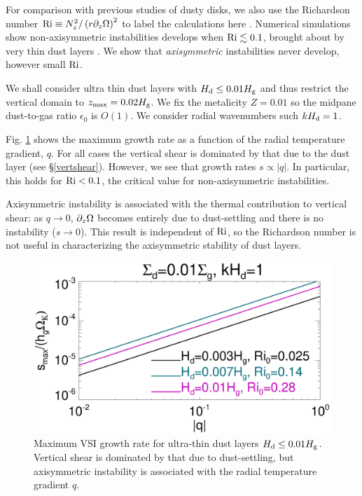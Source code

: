 For comparison with previous studies of dusty disks, we also use 
the Richardson number $\mathrm{Ri} \equiv N_z^2/\left(r\partial_z\Omega\right)^2$
to label the calculations here \citep{youdin02}.   
Numerical simulations show   
non-axisymmetric instabilities develops when $\mathrm{Ri}\lesssim0.1$, brought about
by very thin dust layers \citep{chiang08, lee10}. We show that \emph{axisymmetric}
instabilities never develop, however small $\mathrm{Ri}$. 

We shall consider ultra thin dust layers with $H_\mathrm{d}\leq 0.01H_\mathrm{g}$ and thus
restrict the vertical domain to $z_\mathrm{max} = 0.02H_\mathrm{g}$. We fix the 
metalicity $Z=0.01$ so the midpane dust-to-gas ratio $\epsilon_0$ is 
$O(1)$.  We consider radial wavenumbers such $kH_\mathrm{d}=1$. 

Fig. \ref{ultra_thin} shows the maximum growth rate  as a function of
the radial temperature gradient, $q$. For all cases the vertical
shear is dominated by that due to the dust layer (see
\S\ref{vertshear}). However, we see that growth rates $s\propto
|q|$. In particular, this holds for $\mathrm{Ri} < 0.1$, the critical value
for non-axisymmetric instabilities. 

Axisymmetric instability is associated with the thermal
contribution to vertical shear: as $q\to0$,  $\partial_z\Omega$ becomes
entirely due to dust-settling and there is no instability ($s\to
0$). This result is independent of $\mathrm{Ri}$, so the Richardson number
is not useful in characterizing the axisymmetric stability of dust
layers. 

\begin{figure}
  \includegraphics[width=\linewidth]{figures/compare_eigenvals_thindust} 
  \caption{Maximum VSI growth rate for ultra-thin dust layers $H_\mathrm{d}
    \leq 0.01H_\mathrm{g}$. Vertical shear is dominated by that due to
    dust-settling, but axisymmetric instability is associated with the
    radial temperature gradient $q$.
    \label{ultra_thin}
    }
\end{figure}




